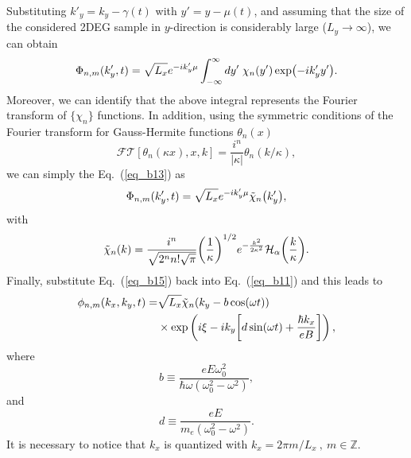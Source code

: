 Substituting ${k'_y} = k_y -\gamma(t)$ with $y' = y -\mu(t)$, and assuming that the size of the considered 2DEG sample in $y$-direction is considerably large ($L_y \rightarrow \infty$), we can obtain
\begin{equation} \label{eq_b13}
  \Phi_{n,m}({k'_y} ,t) =
  {\sqrt{L_x}} e^{-i {k'_y}\mu}
  \int_{-\infty}^{\infty} dy'\;
  \chi_{n}\qty(y')
  \exp(-i{k'_y} y').
\end{equation}
Moreover, we can identify that the above integral represents the Fourier transform of $\{\chi_n\}$ functions. In addition, using the symmetric conditions of the Fourier transform for Gauss-Hermite functions $\theta_n(x)$ \cite{celeghini21}
\begin{equation} \label{eq_b14}
  \mathcal{FT}[\theta_n(\kappa x),x,k] = \frac{i^n}{|\kappa|}\theta_n(k/\kappa),
\end{equation}
we can simply the Eq.~(\ref{eq_b13}) as
\begin{equation} \label{eq_b15}
  \Phi_{n,m}({k'_y} ,t) =
    \sqrt{L_x}e^{-i {k'_y}\mu}
    \tilde{\chi}_{n}\qty({k'_y}),
\end{equation}
with
\begin{equation} \label{eq_b16}
  \tilde{\chi}_{n}\qty(k) =
  \frac{i^n}{\sqrt{2^{n} n! \sqrt{\pi}}}
  \qty(\frac{1}{\kappa})^{1/2}
  e^{-\frac{k^2}{2 \kappa^2}}
  \mathcal{H}_{\alpha} \qty(\frac{k}{\kappa}).
\end{equation}
Finally, substitute Eq.~(\ref{eq_b15}) back into Eq.~(\ref{eq_b11}) and this leads to
\begin{equation} \label{eq_b17}
  \begin{aligned}
    \phi_{n,m}(k_x,k_y,t)  = &
    {\sqrt{L_x}}
    \tilde{\chi}_{n}\qty(k_y - b\cos(\omega t)) \\
    & \times
    \text{exp}\left(
      i\xi
      -ik_y  \qty[d\sin(\omega t) + \frac{\hbar k_x}{eB}]
    \right),
  \end{aligned}
\end{equation}
where
\begin{equation} \label{eq_b18}
  b \equiv
  \frac{eE\omega_0^2}{\hbar\omega(\omega_0^2 - \omega^2)},
\end{equation}
and
\begin{equation} \label{eq_b18}
  d \equiv
 \frac{eE}{m_e(\omega_0^2 - \omega^2)}.
\end{equation}
It is necessary to notice that $k_x$ is quantized with $k_x = 2\pi m/L_x ~,~ m \in \mathbb{Z}$.
